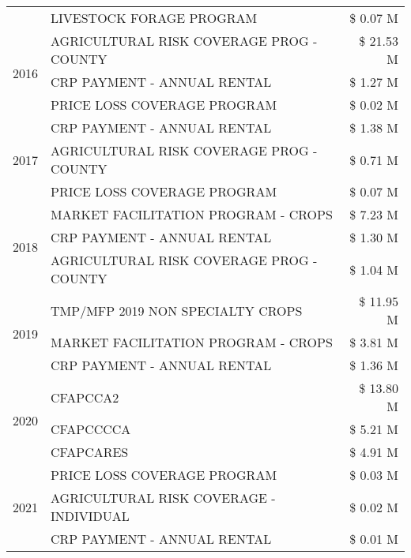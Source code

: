 \begin{tabular}{llr}
 & LIVESTOCK FORAGE PROGRAM & \$ 0.07 M \\
\cline{1-3}
\multirow[t]{3}{*}{2016} & AGRICULTURAL RISK COVERAGE PROG - COUNTY      & \$ 21.53 M \\
 & CRP PAYMENT - ANNUAL RENTAL                   & \$ 1.27 M \\
 & PRICE LOSS COVERAGE PROGRAM                   & \$ 0.02 M \\
\cline{1-3}
\multirow[t]{3}{*}{2017} & CRP PAYMENT - ANNUAL RENTAL & \$ 1.38 M \\
 & AGRICULTURAL RISK COVERAGE PROG - COUNTY & \$ 0.71 M \\
 & PRICE LOSS COVERAGE PROGRAM & \$ 0.07 M \\
\cline{1-3}
\multirow[t]{3}{*}{2018} & MARKET FACILITATION PROGRAM - CROPS & \$ 7.23 M \\
 & CRP PAYMENT - ANNUAL RENTAL & \$ 1.30 M \\
 & AGRICULTURAL RISK COVERAGE PROG - COUNTY & \$ 1.04 M \\
\cline{1-3}
\multirow[t]{3}{*}{2019} & TMP/MFP 2019 NON SPECIALTY CROPS & \$ 11.95 M \\
 & MARKET FACILITATION PROGRAM - CROPS & \$ 3.81 M \\
 & CRP PAYMENT - ANNUAL RENTAL & \$ 1.36 M \\
\cline{1-3}
\multirow[t]{3}{*}{2020} & CFAPCCA2 & \$ 13.80 M \\
 & CFAPCCCCA & \$ 5.21 M \\
 & CFAPCARES & \$ 4.91 M \\
\cline{1-3}
\multirow[t]{3}{*}{2021} & PRICE LOSS COVERAGE PROGRAM & \$ 0.03 M \\
 & AGRICULTURAL RISK COVERAGE - INDIVIDUAL & \$ 0.02 M \\
 & CRP PAYMENT - ANNUAL RENTAL & \$ 0.01 M \\
\cline{1-3}
\bottomrule
\end{tabular}
